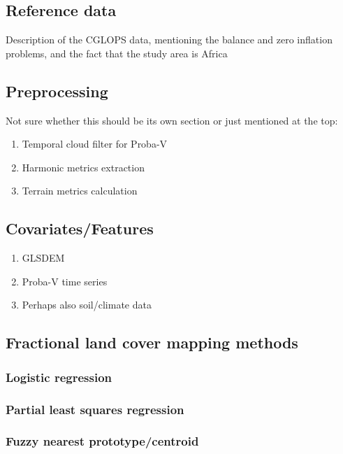 \documentclass[a4paper,10pt]{article}
\begin{document}
\subsection{Reference data}

Description of the CGLOPS data, mentioning the balance and zero inflation problems, and the fact that the study area is Africa

\subsection{Preprocessing}

Not sure whether this should be its own section or just mentioned at the top:

\begin{enumerate}
 \item Temporal cloud filter for Proba-V
 \item Harmonic metrics extraction
 \item Terrain metrics calculation
\end{enumerate}

\subsection{Covariates/Features}

\begin{enumerate}
 \item GLSDEM
 \item Proba-V time series
 \item Perhaps also soil/climate data
\end{enumerate}

\subsection{Fractional land cover mapping methods}

\subsubsection{Logistic regression}

\subsubsection{Partial least squares regression}

\subsubsection{Fuzzy nearest prototype/centroid}
\end{document}
